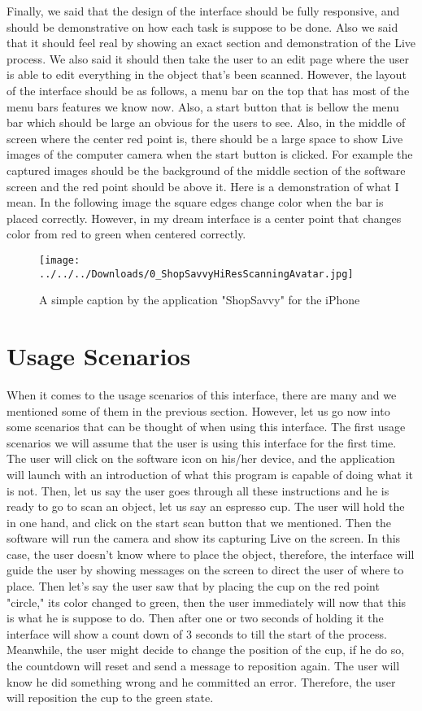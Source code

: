 \documentclass[12pt, oneside]{amsart}   	%
\begin{document}
Finally, we said that the design of the interface should be fully responsive, and should be demonstrative on how each task is suppose to be done.  Also we said that it should feel real by showing an exact section and demonstration of the Live process.  We also said it should then take the user to an edit page where the user is able to edit everything in the object that's been scanned.  However, the layout of the interface should be as follows, a menu bar on the top that has most of the menu bars features we know now.  Also, a start button that is bellow the menu bar which should be large an obvious for the users to see.  Also, in the middle of screen where the center red point is, there should be a large space to show Live images of the computer camera when the start button is clicked.  For example the captured images should be the background of the middle section of the software screen and the red point should be above it.  Here is a demonstration of what I mean. In the following image the square edges change color when the bar is placed correctly. However, in my dream interface is a center point that changes color from red to green when centered correctly.

\begin{figure}[ht!]
\centering
\texttt{[image: ../../../Downloads/0\_ShopSavvyHiResScanningAvatar.jpg]}
\caption{A simple caption by the application "ShopSavvy" for the iPhone}
\label{overflow}
\end{figure}

 \section{Usage Scenarios}
When it comes to the usage scenarios of this interface, there are many and we mentioned some of them in the previous section.  However, let us go now into some scenarios that can be thought of when using this interface.  The first usage scenarios we will assume that the user is using this interface for the first time.  The user will click on the software icon on his/her device, and the application will launch with an introduction of what this program is capable of doing what it is not.  Then, let us say the user goes through all these instructions and he is ready to go to scan an object, let us say an espresso cup.  The user will hold the in one hand, and click on the start scan button that we mentioned.  Then the software will run the camera and show its capturing Live on the screen.  In this case, the user doesn't know where to place the object, therefore, the interface will guide the user by showing messages on the screen to direct the user of where to place. Then let's say the user saw that by placing the cup on the red point "circle," its color changed to green, then the user immediately will now that this is what he is suppose to do.  Then after one or two seconds of holding it the interface will show a count down of 3 seconds to till the start of the process. Meanwhile, the user might decide to change the position of the cup, if he do so, the countdown will reset and send a message to reposition again. The user will know he did something wrong and he committed an error. Therefore, the user will reposition the cup to the green state. 
\end{document}
